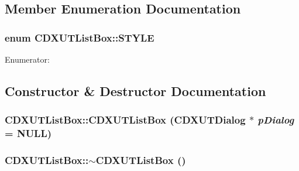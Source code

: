 \subsection{Member Enumeration Documentation}
\hypertarget{class_c_d_x_u_t_list_box_a92ad351d00e5669e6663418d1e959692}{
\subsubsection[{STYLE}]{\setlength{\rightskip}{0pt plus 5cm}enum {\bf CDXUTListBox::STYLE}}}
\label{class_c_d_x_u_t_list_box_a92ad351d00e5669e6663418d1e959692}
\begin{Desc}
\item[Enumerator: ]\par
\begin{description}
\item[{\em 
\hypertarget{class_c_d_x_u_t_list_box_a92ad351d00e5669e6663418d1e959692a78abef1cd19ad444bb04c015c42d270d}{
MULTISELECTION}
\label{class_c_d_x_u_t_list_box_a92ad351d00e5669e6663418d1e959692a78abef1cd19ad444bb04c015c42d270d}
}]\end{description}
\end{Desc}



\subsection{Constructor \& Destructor Documentation}
\hypertarget{class_c_d_x_u_t_list_box_acd6d6d877a81e65b26e01093951c3c50}{
\subsubsection[{CDXUTListBox}]{\setlength{\rightskip}{0pt plus 5cm}CDXUTListBox::CDXUTListBox ({\bf CDXUTDialog} $\ast$ {\em pDialog} = {\ttfamily NULL})}}
\label{class_c_d_x_u_t_list_box_acd6d6d877a81e65b26e01093951c3c50}
\hypertarget{class_c_d_x_u_t_list_box_aed019ebbcc78ddb72432959495d29040}{
\subsubsection[{$\sim$CDXUTListBox}]{\setlength{\rightskip}{0pt plus 5cm}CDXUTListBox::$\sim$CDXUTListBox ()}}
\label{class_c_d_x_u_t_list_box_aed019ebbcc78ddb72432959495d29040}


